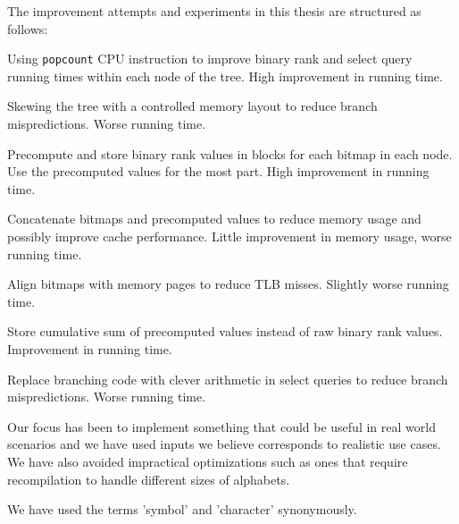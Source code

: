 The improvement attempts and experiments in this thesis are structured as follows:
\begin{description*}
\item[Using \texttt{popcount} CPU instruction] to improve binary rank and select query running times within each node of the tree. High improvement in running time.
\item[Skewing the tree] with a controlled memory layout to reduce branch mispredictions. Worse running time.
\item[Precompute and store binary rank values] in blocks for each bitmap in each node. Use the precomputed values for the most part. High improvement in running time.
\item[Concatenate bitmaps and precomputed values] to reduce memory usage and possibly improve cache performance. Little improvement in memory usage, worse running time.
\item[Align bitmaps with memory pages] to reduce TLB misses. Slightly worse running time.
\item[Store cumulative sum of precomputed values] instead of raw binary rank values. Improvement in running time.
\item[Replace branching code with clever arithmetic] in select queries to reduce branch mispredictions. Worse running time.
\end{description*}
Our focus has been to implement something that could be useful in real world scenarios and we have used inputs we believe corresponds to realistic use cases.
We have also avoided impractical optimizations such as ones that require recompilation to handle different sizes of alphabets.

We have used the terms 'symbol' and 'character' synonymously.